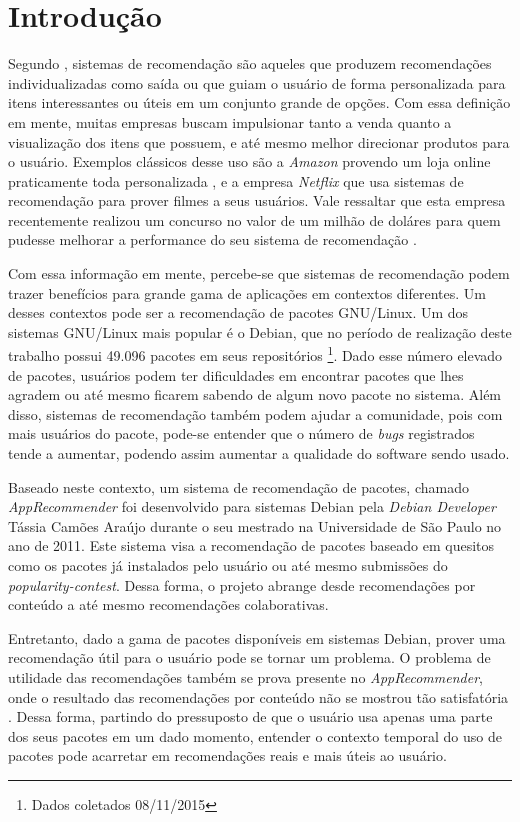 \chapter[Introdução]{Introdução}

Segundo , sistemas de recomendação são aqueles que
produzem recomendações individualizadas como saída ou que guiam o usuário
de forma personalizada para itens interessantes ou úteis em um conjunto
grande de opções. Com essa definição em mente, muitas empresas buscam
impulsionar tanto a venda quanto a visualização dos itens que possuem, e até mesmo
melhor direcionar produtos para o usuário. Exemplos clássicos desse uso são a
\textit{Amazon} provendo um loja online praticamente toda personalizada
\cite{jannach2008finding}, e a empresa \textit{Netflix} que usa sistemas de recomendação
para prover filmes a seus usuários. Vale ressaltar que esta empresa recentemente
realizou um concurso no valor de um milhão de doláres para quem pudesse melhorar
a performance do seu sistema de recomendação \cite{koren2009matrix}.

Com essa informação em mente, percebe-se que sistemas de recomendação podem
trazer benefícios para grande gama de aplicações em contextos diferentes. Um
desses contextos pode ser a recomendação de pacotes GNU/Linux. Um dos sistemas
GNU/Linux mais popular é o Debian, que no período de realização deste trabalho
possui 49.096 pacotes em seus repositórios \footnote{Dados coletados
08/11/2015}. Dado esse número elevado de pacotes, usuários podem ter
dificuldades em encontrar pacotes que lhes agradem ou até mesmo ficarem sabendo
de algum novo pacote no sistema. Além disso, sistemas de recomendação também
podem ajudar a comunidade, pois com mais usuários do pacote, pode-se entender que
o número de \textit{bugs} registrados tende a aumentar, podendo assim aumentar a qualidade
do software sendo usado.

Baseado neste contexto, um sistema de recomendação de pacotes, chamado
\textit{AppRecommender} foi desenvolvido para sistemas Debian pela
\textit{Debian Developer} Tássia Camões Araújo durante
o seu mestrado na Universidade de São Paulo no ano de 2011. Este sistema visa a
recomendação de pacotes baseado em quesitos como os pacotes já instalados pelo
usuário ou até mesmo submissões do \textit{popularity-contest}. Dessa forma, o
projeto abrange desde recomendações por conteúdo a até mesmo recomendações
colaborativas.

Entretanto, dado a gama de pacotes disponíveis em sistemas Debian, prover uma
recomendação útil para o usuário pode se tornar um problema. O problema de
utilidade das recomendações também se prova presente no \textit{AppRecommender},
onde o resultado das recomendações por conteúdo não se mostrou tão satisfatória
\cite{araujo2011apprecommender}. Dessa forma, partindo do
pressuposto de que o usuário usa apenas uma parte dos seus pacotes em um dado
momento, entender o contexto temporal do uso de pacotes pode acarretar em recomendações reais e
mais úteis ao usuário.

